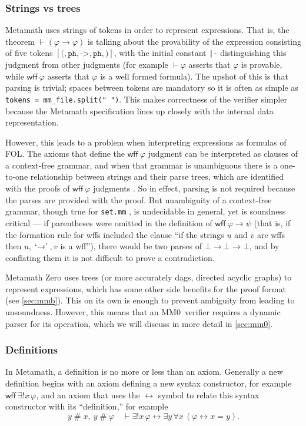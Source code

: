 \documentclass[runningheads]{llncs}
\newcommand{\mmO}{\textsf{MM0}}
\newcommand{\fresh}{\mathrel{\#}}
\newcommand{\wff}{\mathsf{wff}\ }
\begin{document}
\subsubsection{Strings vs trees}
Metamath uses strings of tokens in order to represent expressions. That is, the theorem $\vdash(\varphi\to\varphi)$ is talking about the provability of the expression consisting of five tokens $[\texttt{(}, \texttt{ph}, \texttt{->}, \texttt{ph}, \texttt{)}]$, with the initial constant \texttt{|-} distinguishing this judgment from other judgments (for example $\vdash\varphi$ asserts that $\varphi$ is provable, while $\wff\varphi$ asserts that $\varphi$ is a well formed formula). The upshot of this is that parsing is trivial; spaces between tokens are mandatory so it is often as simple as \texttt{tokens = mm\_file.split(" ")}. This makes correctness of the verifier simpler because the Metamath specification lines up closely with the internal data representation.

However, this leads to a problem when interpreting expressions as formulas of FOL. The axioms that define the $\wff\varphi$ judgment can be interpreted as clauses of a context-free grammar, and when that grammar is unambiguous there is a one-to-one relationship between strings and their parse trees, which are identified with the proofs of $\wff\varphi$ judgments \cite{Carn16}. So in effect, parsing is not required because the parses are provided with the proof. But unambiguity of a context-free grammar, though true for \texttt{set.mm} \cite{unambiguous}, is undecidable in general, yet is soundness critical --- if parentheses were omitted in the definition of $\wff\varphi\to\psi$ (that is, if the formation rule for wffs included the clause ``if the strings $u$ and $v$ are wffs then $u,\mbox{`$\to$'},v$ is a wff''), there would be two parses of $\bot\to\bot\to\bot$, and by conflating them it is not difficult to prove a contradiction.

Metamath Zero uses trees (or more accurately dags, directed acyclic graphs) to represent expressions, which has some other side benefits for the proof format (see \autoref{sec:mmb}). This on its own is enough to prevent ambiguity from leading to unsoundness. However, this means that an \mmO\ verifier requires a dynamic parser for its operation, which we will discuss in more detail in \autoref{sec:mm0}.

\subsubsection{Definitions}
In Metamath, a definition is no more or less than an axiom. Generally a new definition begins with an axiom defining a new syntax constructor, for example $\wff\exists! x\,\varphi$, and an axiom that uses the $\leftrightarrow$ symbol to relate this syntax constructor with its ``definition,'' for example $$y\fresh x,\ y\fresh \varphi\quad \vdash \exists! x\,\varphi\leftrightarrow\exists y\,\forall x\,(\varphi\leftrightarrow x=y).$$
\end{document}
